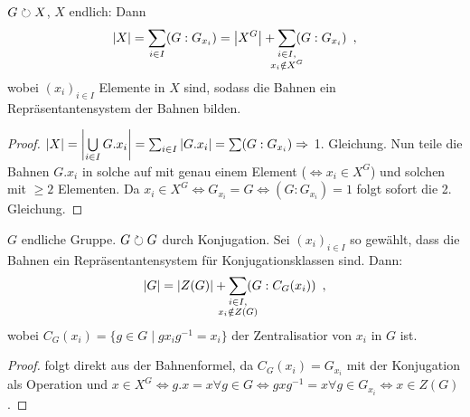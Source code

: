 \documentclass[12pt,a4paper]{scrartcl}
\begin{document}
\begin{satz}
	$G\operates X$, $X$ endlich: Dann $$|X| = \sum_{i\in I}(G:G_{x_i}) = \abs*{X^G} + \sum_{\mathclap{\substack{i\in I,\\x_i\notin X^G}}}(G:G_{x_i})\enspace,$$ wobei $(x_i)_{i\in I}$ Elemente in $X$ sind, sodass die Bahnen ein Repräsentantensystem der Bahnen bilden.
\end{satz}

\begin{proof} $|X| = \abs*{\bigcup\limits_{i\in I} G.x_i} = \sum_{i\in I}|G.x_i| = \sum (G:G_{x_i}) \Rightarrow$ 1. Gleichung. Nun teile die Bahnen $G.x_i$ in solche auf mit genau einem Element ($\Leftrightarrow x_i\in X^G$) und solchen mit $\geq 2$ Elementen. Da $x_i\in X^G\Leftrightarrow G_{x_i} = G\Leftrightarrow (G:G_{x_i}) = 1$ folgt sofort die 2. Gleichung.
\end{proof}

\begin{satz}[Satz 5.3]
	$G$ endliche Gruppe. $G\operates G$ durch Konjugation. Sei $(x_i)_{i\in I}$ so gewählt, dass die Bahnen ein Repräsentantensystem für Konjugationsklassen sind. Dann: \[ |G|  = |Z(G)| + \sum_{\mathclap{\substack{i\in I,\\x_i\notin Z(G)}}}(G: C_G(x_i))\enspace ,\] wobei $C_G(x_i) = \{g\in G\mid gx_ig^{-1} = x_i\}$ der Zentralisatior von $x_i$ in $G$ ist.
\end{satz}

\begin{proof}
	folgt direkt aus der Bahnenformel, da $C_G(x_i) = G_{x_i}$ mit der Konjugation als Operation und $x\in X^G\Leftrightarrow g.x = x\forall g\in G\Leftrightarrow gxg^{-1} = x\forall g\in G_{x_i}\Leftrightarrow x\in Z(G)$.
\end{proof}

\end{document}
